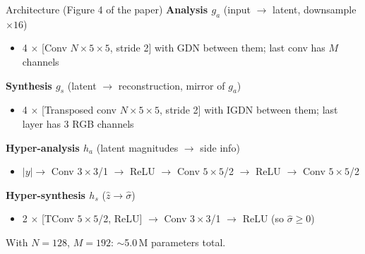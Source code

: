\documentclass[aspectratio=169, 12pt]{beamer}
\begin{document}
\begin{frame}{Architecture (Figure 4 of the paper)}
    \small
    \textbf{Analysis $g_a$} \hfill (input $\to$ latent, downsample $\times 16$)
    \begin{itemize}
        \item 4 $\times$ [Conv $N \times 5\times 5$, stride 2] with GDN between them; last conv has $M$ channels
    \end{itemize}

    \textbf{Synthesis $g_s$} \hfill (latent $\to$ reconstruction, mirror of $g_a$)
    \begin{itemize}
        \item 4 $\times$ [Transposed conv $N \times 5\times 5$, stride 2] with IGDN between them; last layer has 3 RGB channels
    \end{itemize}

    \textbf{Hyper-analysis $h_a$} \hfill (latent magnitudes $\to$ side info)
    \begin{itemize}
        \item $|y| \to$ Conv $3\times 3$/1 $\to$ ReLU $\to$ Conv $5\times 5$/2 $\to$ ReLU $\to$ Conv $5\times 5$/2
    \end{itemize}

    \textbf{Hyper-synthesis $h_s$} \hfill ($\hat z \to \hat\sigma$)
    \begin{itemize}
        \item 2 $\times$ [TConv $5\times 5$/2, ReLU] $\to$ Conv $3\times 3$/1 $\to$ ReLU \quad (so $\hat\sigma \ge 0$)
    \end{itemize}

    \vspace{0.15cm}
    \begin{keypoint}
    \footnotesize With $N=128$, $M=192$: $\sim$5.0\,M parameters total.
    \end{keypoint}
\end{frame}
\end{document}
